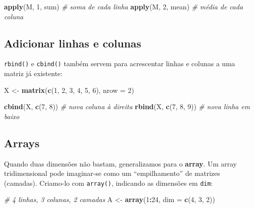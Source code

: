 \documentclass[
  portuguese,
  11pt,
  openany]{book}
\newenvironment{Shaded}{\begin{snugshade}}{\end{snugshade}}
\newcommand{\AttributeTok}[1]{\textcolor[rgb]{0.13,0.29,0.53}{#1}}
\newcommand{\CommentTok}[1]{\textcolor[rgb]{0.56,0.35,0.01}{\textit{#1}}}
\newcommand{\DecValTok}[1]{\textcolor[rgb]{0.00,0.00,0.81}{#1}}
\newcommand{\FunctionTok}[1]{\textcolor[rgb]{0.13,0.29,0.53}{\textbf{#1}}}
\newcommand{\NormalTok}[1]{#1}
\newcommand{\OtherTok}[1]{\textcolor[rgb]{0.56,0.35,0.01}{#1}}
\newcommand{\SpecialCharTok}[1]{\textcolor[rgb]{0.81,0.36,0.00}{\textbf{#1}}}
\begin{document}
\begin{Shaded}
\begin{Highlighting}[]
\FunctionTok{apply}\NormalTok{(M, }\DecValTok{1}\NormalTok{, sum)    }\CommentTok{\# soma de cada linha}
\FunctionTok{apply}\NormalTok{(M, }\DecValTok{2}\NormalTok{, mean)   }\CommentTok{\# média de cada coluna}
\end{Highlighting}
\end{Shaded}

\subsection{Adicionar linhas e colunas}\label{adicionar-linhas-e-colunas}

\texttt{rbind()} e \texttt{cbind()} também servem para acrescentar linhas e colunas a uma matriz
já existente:

\begin{Shaded}
\begin{Highlighting}[]
\NormalTok{X }\OtherTok{\textless{}{-}} \FunctionTok{matrix}\NormalTok{(}\FunctionTok{c}\NormalTok{(}\DecValTok{1}\NormalTok{, }\DecValTok{2}\NormalTok{, }\DecValTok{3}\NormalTok{, }\DecValTok{4}\NormalTok{, }\DecValTok{5}\NormalTok{, }\DecValTok{6}\NormalTok{), }\AttributeTok{nrow =} \DecValTok{2}\NormalTok{)}

\FunctionTok{cbind}\NormalTok{(X, }\FunctionTok{c}\NormalTok{(}\DecValTok{7}\NormalTok{, }\DecValTok{8}\NormalTok{))          }\CommentTok{\# nova coluna à direita}
\FunctionTok{rbind}\NormalTok{(X, }\FunctionTok{c}\NormalTok{(}\DecValTok{7}\NormalTok{, }\DecValTok{8}\NormalTok{, }\DecValTok{9}\NormalTok{))       }\CommentTok{\# nova linha em baixo}
\end{Highlighting}
\end{Shaded}

\subsection{Arrays}\label{arrays}

Quando duas dimensões não bastam, generalizamos para o \textbf{array}. Um array
tridimensional pode imaginar-se como um ``empilhamento'' de matrizes (camadas).
Criamo-lo com \texttt{array()}, indicando as dimensões em \texttt{dim}:

\begin{Shaded}
\begin{Highlighting}[]
\CommentTok{\# 4 linhas, 3 colunas, 2 camadas}
\NormalTok{A }\OtherTok{\textless{}{-}} \FunctionTok{array}\NormalTok{(}\DecValTok{1}\SpecialCharTok{:}\DecValTok{24}\NormalTok{, }\AttributeTok{dim =} \FunctionTok{c}\NormalTok{(}\DecValTok{4}\NormalTok{, }\DecValTok{3}\NormalTok{, }\DecValTok{2}\NormalTok{))}
\end{Highlighting}
\end{Shaded}
\end{document}
